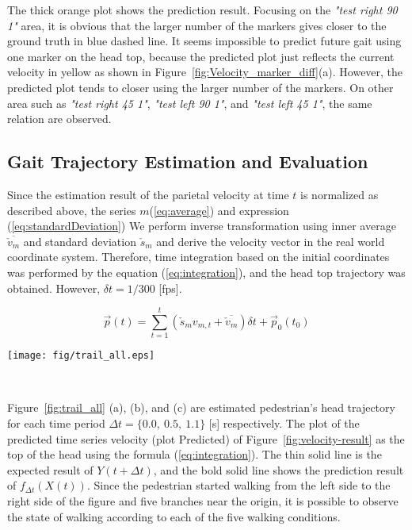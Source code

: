 \documentclass{sigchi}
\begin{document}
The thick orange plot shows the prediction result. Focusing on the \textit{"test right 90 1"} area, it is obvious that the larger number of the markers gives closer to the ground truth in blue dashed line. It seems impossible to predict future gait using one marker on the head top, because the predicted plot just reflects the current velocity in yellow as shown in Figure~\ref{fig:Velocity_marker_diff}(a). However, the predicted plot tends to closer using the larger number of the markers. On other area such as  \textit{"test right 45 1"},   \textit{"test left 90 1"}, and  \textit{"test left  45 1"}, the same relation are observed.


\subsection{Gait Trajectory Estimation and Evaluation}

Since the estimation result of the parietal velocity at time $ t $ is normalized as described above, the series $ m $(\ref {eq:average}) and expression (\ref {eq:standardDeviation}) We perform inverse transformation using inner average $ \overline {\check {v} _ {m}} $ and standard deviation $ \check {s} _ m $ and derive the velocity vector in the real world coordinate system. Therefore, time integration based on the initial coordinates was performed by the equation (\ref {eq:integration}), and the head top trajectory was obtained. However, $ \delta t = 1/300 $ [fps].

\begin{equation}
\vec{p}(t) = \sum^{t}_{t=1}(\check{s}_m  v_{m,t} +  \overline{\check{v}_{m}})  \delta t+ \vec{p}_0(t_0)
\label{eq:integration}
\end{equation}

\begin{figure*}
\centering
  \texttt{[image: fig/trail\_all.eps]}
  \caption{Gait trajectory estimated with the predicted velocity of participant's top head. Figure (a)-(c) are obtained with Deep Brief Net (DBN) model shown in Figure~\ref{fig:dbn}. Figure (d) and (e) are obtained with \textit{time shift} data structure as well as extended DBN model shown in Figure~\ref{fig:dbn_timeshift}.}
  ~\label{fig:trail_all}
\end{figure*}




Figure~\ref{fig:trail_all} (a), (b), and (c) are estimated pedestrian's head trajectory for each time period $ \Delta t = \{0.0, \ 0.5, \ 1.1 \} $ [s] respectively. The plot of the predicted time series velocity (plot Predicted) of Figure~\ref{fig:velocity-result} as the top of the head using the formula (\ref {eq:integration}). The thin solid line is the expected result of $ Y (t + \Delta t) $, and the bold solid line shows the prediction result of $ f_ {\Delta t} (X (t)) $. Since the pedestrian started walking from the left side to the right side of the figure and five branches near the origin, it is possible to observe the state of walking according to each of the five walking conditions.
\end{document}
